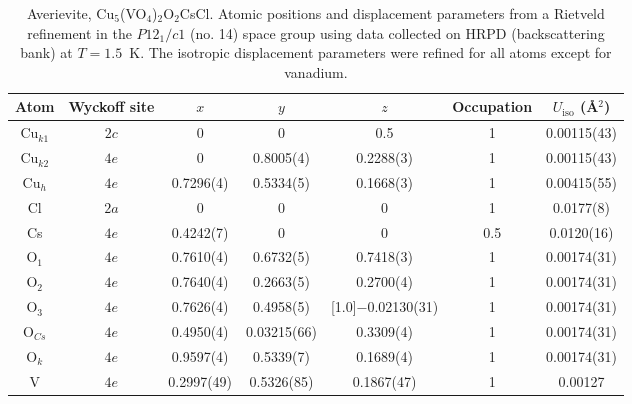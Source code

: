 \documentclass[
sn-mathphys,
Numbered,
onecolumn]
{sn-jnl}%
\newcommand{\minus}{\scalebox{0.75}[1.0]{$-$}}
\newcommand{\ave}{Cu$_5$(VO$_4$)$_{2}$O$_2$CsCl}
\begin{document}
\begin{table}[ht!]
    \centering
    \begin{adjustbox}{max width=\textwidth}
    \begin{tabular}{c c c c c c c } \hline \hline
     Atom  & Wyckoff site & $x$ & $y$ & $z$ & Occupation & $U_\mathrm{iso}$ (\AA$^2$) \\ \hline
  Cu$_{k1}$ & $2c$ & 0 & 0 & 0.5  & 1 & 0.00115(43)  \\
  Cu$_{k2}$ & $4e$ & 0 & 0.8005(4) & 0.2288(3)  & 1 & 0.00115(43)  \\
  Cu$_h$ &  $4e$ & 0.7296(4)  & 0.5334(5) &  0.1668(3)  & 1 & 0.00415(55) \\
 Cl &  $2a$ &  0 &  0 &  0 & 1 & 0.0177(8) \\
 Cs &  $4e$ &  0.4242(7) & 0 & 0 & 0.5  & 0.0120(16) \\
 O$_1$ & $4e$ & 0.7610(4)  & 0.6732(5) &  0.7418(3)  & 1 & 0.00174(31)  \\
 O$_2$ & $4e$ & 0.7640(4)  & 0.2663(5) & 0.2700(4)  & 1 & 0.00174(31)  \\
 O$_{3}$ & $4e$ & 0.7626(4)  & 0.4958(5) & \minus 0.02130(31)  & 1 & 0.00174(31)  \\
 O$_{Cs}$ & $4e$ & 0.4950(4) & 0.03215(66)  & 0.3309(4)   & 1 & 0.00174(31)  \\
  O$_k$ & $4e$ & 0.9597(4) & 0.5339(7) & 0.1689(4)   & 1 & 0.00174(31)  \\
 V & $4e$ & 0.2997(49) & 0.5326(85) & 0.1867(47) & 1 & 0.00127  \\

 \hline \hline
   
\end{tabular}
\end{adjustbox}
    \caption{Averievite, \ave. Atomic positions and displacement parameters from a Rietveld refinement in the $P12_1/c1$ (no. 14) space group using data collected on HRPD (backscattering bank) at $T=1.5$~K. The isotropic displacement parameters were refined for all atoms except for vanadium. }
    \label{avv_1K_params}
\end{table}
\end{document}
